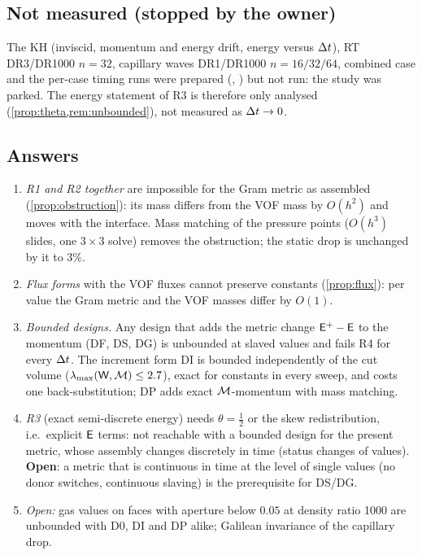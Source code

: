 \subsection{Not measured (stopped by the owner)}\label{sec:missing}
The KH (inviscid, momentum and energy drift, energy versus $\Delta t$), RT DR3/DR1000 $n=32$,
capillary waves DR1/DR1000 $n=16/32/64$, combined case and the per-case timing runs were
prepared (, ) but not run: the study was parked.  The energy
statement of R3 is therefore only analysed (\cref{prop:theta,rem:unbounded}), not measured
as $\Delta t\to0$.

\subsection{Answers}\label{sec:answers}
\begin{enumerate}[leftmargin=*,itemsep=2pt]
\item \emph{R1 and R2 together} are impossible for the Gram metric as assembled
  (\cref{prop:obstruction}): its mass differs from the VOF mass by $O(h^2)$ and moves with
  the interface.  Mass matching of the pressure points ($O(h^3)$ slides, one $3\times3$
  solve) removes the obstruction; the static drop is unchanged by it to 3\%.
\item \emph{Flux forms} with the VOF fluxes cannot preserve constants (\cref{prop:flux}):
  per value the Gram metric and the VOF masses differ by $O(1)$.
\item \emph{Bounded designs.} Any design that adds the metric change $\mathsf E^+-\mathsf E$ to the momentum
  (DF, DS, DG) is unbounded at slaved values and fails R4 for every $\Delta t$.  The increment
  form DI is bounded independently of the cut volume ($\lambda_{\max}(\mathsf W,\mathcal M)\le2.7$), exact
  for constants in every sweep, and costs one back-substitution; DP adds exact $\mathcal M$-momentum
  with mass matching.
\item \emph{R3} (exact semi-discrete energy) needs $\theta=\tfrac12$ or the skew
  redistribution, i.e.\ explicit $\mathsf E$ terms: not reachable with a bounded design for the
  present metric, whose assembly changes discretely in time (status changes of values).
  \textbf{Open}: a metric that is continuous in time at the level of single values (no donor
  switches, continuous slaving) is the prerequisite for DS/DG.
\item \emph{Open:} gas values on faces with aperture below $0.05$ at density ratio 1000 are
  unbounded with D0, DI and DP alike; Galilean invariance of the capillary drop.
\end{enumerate}
